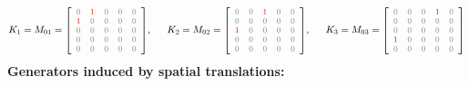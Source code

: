 \begin{equation*}
K_{1} = M_{01} = \textnormal{\footnotesize$\left[{\color{gray}
	\begin{array}{rrrrr}
	0 & {\color{red}1} & 0 & 0 & 0\\
	{\color{red}1} & 0 & 0 & 0 & 0\\
	0 & 0 & 0 & 0 & 0 \\
	0 & 0 & 0 & 0 & 0 \\
	0 & 0 & 0 & 0 & 0 \\
	\end{array}
	}\right]$},
\quad\;\;
K_{2} = M_{02} = \textnormal{\footnotesize$\left[{\color{gray}
	\begin{array}{rrrrr}
	0 & 0 & {\color{red}1} & 0 & 0\\
	0 & 0 & 0 & 0 & 0\\
	{\color{red}1} & 0 & 0 & 0 & 0 \\
	0 & 0 & 0 & 0 & 0 \\
	0 & 0 & 0 & 0 & 0 \\
	\end{array}
	}\right]$},
\quad\;\;
K_{3} = M_{03} = \textnormal{\footnotesize$\left[{\color{gray}
	\begin{array}{rrrrr}
	0 & 0 & 0 & {\color{red}1} & 0\\
	0 & 0 & 0 & 0 & 0\\
	0 & 0 & 0 & 0 & 0 \\
	{\color{red}1} & 0 & 0 & 0 & 0 \\
	0 & 0 & 0 & 0 & 0 \\
	\end{array}
	}\right]$}
\end{equation*}
\noindent
\textbf{Generators induced by spatial translations:}
